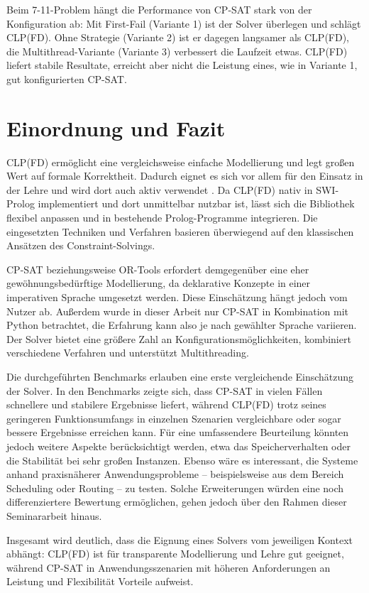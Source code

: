 \documentclass[12pt,a4paper]{article}
\begin{document}
\noindent
Beim 7-11-Problem hängt die Performance von CP-SAT stark von der Konfiguration ab: Mit First-Fail (Variante 1) ist der Solver überlegen und schlägt CLP(FD).
Ohne Strategie (Variante 2) ist er dagegen langsamer als CLP(FD), die Multithread-Variante (Variante 3) verbessert die Laufzeit etwas.
CLP(FD) liefert stabile Resultate, erreicht aber nicht die Leistung eines, wie in Variante 1, gut konfigurierten CP-SAT.
\section{Einordnung und Fazit}
CLP(FD) ermöglicht eine vergleichsweise einfache Modellierung und legt großen Wert auf formale Korrektheit.
Dadurch eignet es sich vor allem für den Einsatz in der Lehre und wird dort auch aktiv verwendet \cite{drt}.
Da CLP(FD) nativ in SWI-Prolog implementiert und dort unmittelbar nutzbar ist, lässt sich die Bibliothek flexibel anpassen und in bestehende Prolog-Programme integrieren.
Die eingesetzten Techniken und Verfahren basieren überwiegend auf den klassischen Ansätzen des Constraint-Solvings.

CP-SAT beziehungsweise OR-Tools erfordert demgegenüber eine eher gewöhnungsbedürftige Modellierung, da deklarative Konzepte in einer imperativen Sprache umgesetzt werden.
Diese Einschätzung hängt jedoch vom Nutzer ab.
Außerdem wurde in dieser Arbeit nur CP-SAT in Kombination mit Python betrachtet, die Erfahrung kann also je nach gewählter Sprache variieren. 
Der Solver bietet eine größere Zahl an Konfigurationsmöglichkeiten, kombiniert verschiedene Verfahren und unterstützt Multithreading.

Die durchgeführten Benchmarks erlauben eine erste vergleichende Einschätzung der Solver.
In den Benchmarks zeigte sich, dass CP-SAT in vielen Fällen schnellere und stabilere Ergebnisse liefert, während CLP(FD) trotz seines geringeren Funktionsumfangs in einzelnen Szenarien vergleichbare oder sogar bessere Ergebnisse erreichen kann.
Für eine umfassendere Beurteilung könnten jedoch weitere Aspekte berücksichtigt werden, etwa das Speicherverhalten oder die Stabilität bei sehr großen Instanzen.
Ebenso wäre es interessant, die Systeme anhand praxisnäherer Anwendungsprobleme -- beispielsweise aus dem Bereich Scheduling oder Routing -- zu testen.
Solche Erweiterungen würden eine noch differenziertere Bewertung ermöglichen, gehen jedoch über den Rahmen dieser Seminararbeit hinaus.

Insgesamt wird deutlich, dass die Eignung eines Solvers vom jeweiligen Kontext abhängt: CLP(FD) ist für transparente Modellierung und Lehre gut geeignet, während CP-SAT in Anwendungsszenarien mit höheren Anforderungen an Leistung und Flexibilität Vorteile aufweist.
\end{document}
